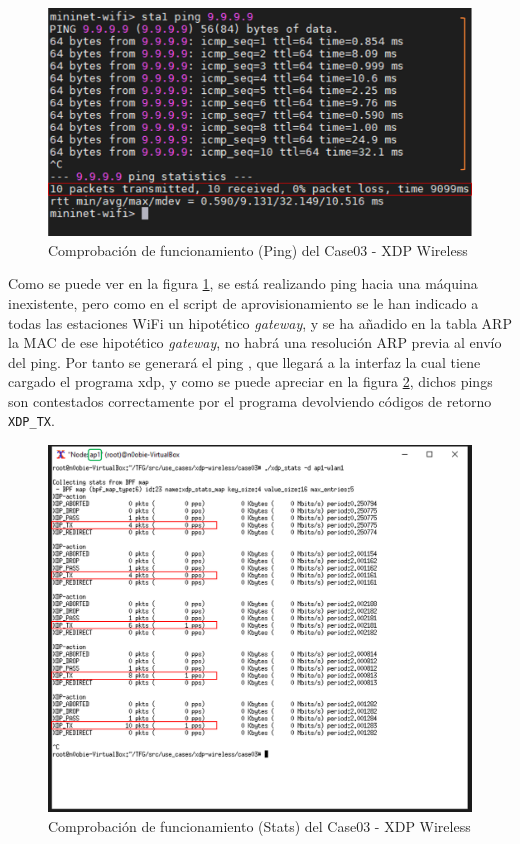 \begin{figure}[ht!]
    \centering
    \includegraphics[width=12cm]{archivos/img/dev/xdp-wifi/case03/demo_case03_1_edited.png}
    \caption{Comprobación de funcionamiento (Ping) del Case03 - XDP Wireless}
    \label{fig:case03_xdp_wifi_func1}
\end{figure}

Como se puede ver en la figura \ref{fig:case03_xdp_wifi_func1}, se está realizando ping hacia una máquina inexistente, pero como en el script de aprovisionamiento se le han indicado a todas las estaciones WiFi un hipotético \textit{gateway}, y se ha añadido en la tabla ARP la MAC de ese hipotético \textit{gateway}, no habrá una resolución ARP previa al envío del ping. Por tanto se generará el ping \hspace{1mm}, que llegará a la interfaz la cual tiene cargado el programa \gls{xdp}, y como se puede apreciar en la figura \ref{fig:case03_xdp_wifi_func2}, dichos pings \hspace{1mm} son contestados correctamente por el programa devolviendo códigos de retorno \texttt{XDP\_TX}.

\begin{figure}[ht!]
    \centering
    \includegraphics[width=15.5cm]{archivos/img/dev/xdp-wifi/case03/demo_case03_2_edited.png}
    \caption{Comprobación de funcionamiento (Stats) del Case03 - XDP Wireless}
    \label{fig:case03_xdp_wifi_func2}
\end{figure}

